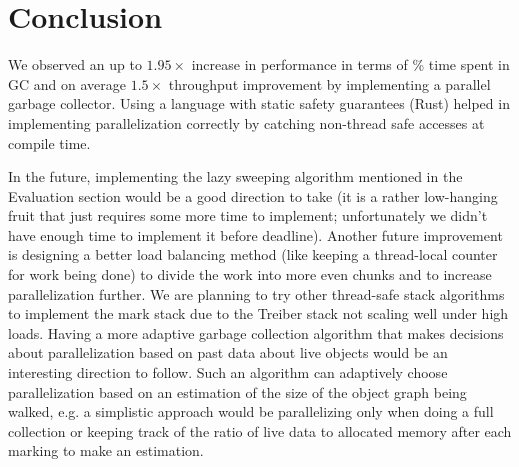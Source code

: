 \section{Conclusion} \label{conclusion}

We observed an up to $1.95\times$ increase in performance in terms of \% time spent in GC and on average $1.5\times$ throughput improvement by implementing a parallel garbage collector.
Using a language with static safety guarantees (Rust) helped in implementing parallelization correctly by catching non-thread safe accesses at compile time.

In the future, implementing the lazy sweeping algorithm mentioned in the Evaluation section would be a good direction to take (it is a rather low-hanging fruit that just requires some more time to implement; unfortunately we didn't have enough time to implement it before deadline).
Another future improvement is designing a better load balancing method (like keeping a thread-local counter for work being done) to divide the work into more even chunks and to increase parallelization further.
We are planning to try other thread-safe stack algorithms to implement the mark stack due to the Treiber stack not scaling well under high loads.
Having a more adaptive garbage collection algorithm that makes decisions about parallelization based on past data about live objects would be an interesting direction to follow.
Such an algorithm can adaptively choose parallelization based on an estimation of the size of the object graph being walked, e.g. a simplistic approach would be parallelizing only when doing a full collection or keeping track of the ratio of live data to allocated memory after each marking to make an estimation.

